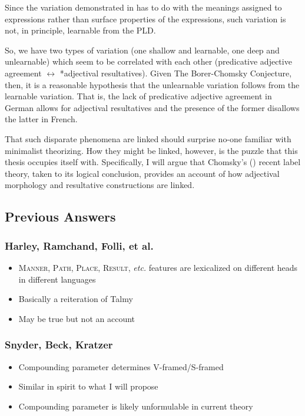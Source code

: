 \documentclass[letterpaper,12pt]{article}
\begin{document}
Since the variation demonstrated in \Last has to do with the meanings assigned to expressions rather than surface properties of the expressions, such variation is not, in principle, learnable from the PLD.

So, we have two types of variation (one shallow and learnable, one deep and unlearnable) which seem to be correlated with each other (predicative adjective agreement $\leftrightarrow$ *adjectival resultatives).
Given The Borer-Chomsky Conjecture, then, it is a reasonable hypothesis that the unlearnable variation follows from the learnable variation.
That is, the lack of predicative adjective agreement in German allows for adjectival resultatives and the presence of the former disallows the latter in French.

That such disparate phenomena are linked should surprise no-one familiar with minimalist theorizing.
How they might be linked, however, is the puzzle that this thesis occupies itself with.
Specifically, I will argue that Chomsky's (\citeyear{chomsky2013problems,chomsky2015problems}) recent label theory, taken to its logical conclusion, provides an account of how adjectival morphology and resultative constructions are linked.


\subsection{Previous Answers}
\subsubsection{Harley, Ramchand, Folli, et al.}
\begin{itemize}
  \item \textsc{Manner, Path, Place, Result}, \textit{etc.} features are lexicalized on different heads in different languages
  \item Basically a reiteration of Talmy
  \item May be true but not an account
\end{itemize}
\subsubsection{Snyder, Beck, Kratzer}
\begin{itemize}
  \item Compounding parameter determines V-framed/S-framed
  \item Similar in spirit to what I will propose
  \item Compounding parameter is likely unformulable in current theory
\end{itemize}
\end{document}
